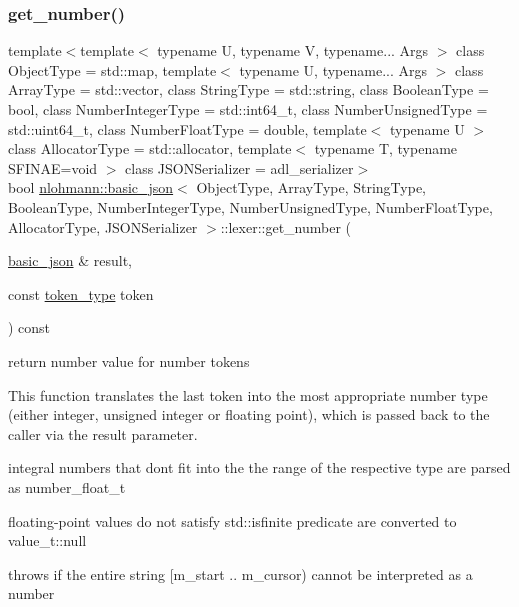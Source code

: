 \subsubsection{\texorpdfstring{get\+\_\+number()}{get\_number()}}
{\footnotesize\ttfamily template$<$template$<$ typename U, typename V, typename... Args $>$ class Object\+Type = std\+::map, template$<$ typename U, typename... Args $>$ class Array\+Type = std\+::vector, class String\+Type  = std\+::string, class Boolean\+Type  = bool, class Number\+Integer\+Type  = std\+::int64\+\_\+t, class Number\+Unsigned\+Type  = std\+::uint64\+\_\+t, class Number\+Float\+Type  = double, template$<$ typename U $>$ class Allocator\+Type = std\+::allocator, template$<$ typename T, typename S\+F\+I\+N\+A\+E=void $>$ class J\+S\+O\+N\+Serializer = adl\+\_\+serializer$>$ \\
bool \hyperlink{classnlohmann_1_1basic__json}{nlohmann\+::basic\+\_\+json}$<$ Object\+Type, Array\+Type, String\+Type, Boolean\+Type, Number\+Integer\+Type, Number\+Unsigned\+Type, Number\+Float\+Type, Allocator\+Type, J\+S\+O\+N\+Serializer $>$\+::lexer\+::get\+\_\+number (\begin{DoxyParamCaption}\item[{\hyperlink{classnlohmann_1_1basic__json}{basic\+\_\+json} \&}]{result,  }\item[{const \hyperlink{classnlohmann_1_1basic__json_1_1lexer_a96887d6cd131e3d3a85a9d71fbdbcdf7}{token\+\_\+type}}]{token }\end{DoxyParamCaption}) const\hspace{0.3cm}{\ttfamily [inline]}}



return number value for number tokens 

This function translates the last token into the most appropriate number type (either integer, unsigned integer or floating point), which is passed back to the caller via the result parameter.

integral numbers that don\textquotesingle{}t fit into the the range of the respective type are parsed as number\+\_\+float\+\_\+t

floating-\/point values do not satisfy std\+::isfinite predicate are converted to value\+\_\+t\+::null

throws if the entire string \mbox{[}m\+\_\+start .. m\+\_\+cursor) cannot be interpreted as a number


